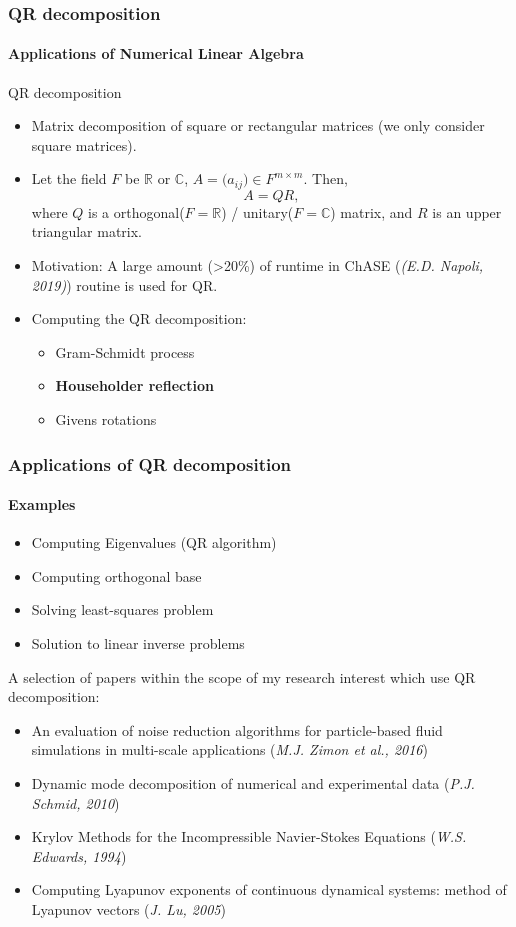 \begin{frame}
\frametitle{QR decomposition}
\framesubtitle{Applications of Numerical Linear Algebra}
QR decomposition
\begin{itemize}
 \item Matrix decomposition of square or rectangular matrices (we only consider square matrices).
 \item Let the field \(F\) be \(\mathbb{R}\) or \(\mathbb{C}\), \(A =\big( a_{ij} \big) \in F^{m \times m}\). Then,
 \begin{equation}
  A = QR,
 \end{equation}
 where \(Q\) is a orthogonal(\(F=\mathbb{R}\)) / unitary(\(F=\mathbb{C}\)) matrix, and \(R\) is an upper triangular matrix.
 \item Motivation: A large amount (>20\%) of runtime in ChASE (\emph{(E.D. Napoli, 2019)}) routine is used for QR.
 \item Computing the QR decomposition:
 \begin{itemize}
  \item Gram-Schmidt process
  \item \textbf{Householder reflection}
  \item Givens rotations
 \end{itemize}
\end{itemize}
\end{frame}

\begin{frame}
\frametitle{Applications of QR decomposition}
\framesubtitle{Examples}
\begin{itemize}
 \item Computing Eigenvalues (QR algorithm)
 \item Computing orthogonal base 
 \item Solving least-squares problem
 \item Solution to linear inverse problems
\end{itemize}
A selection of papers within the scope of my research interest which use QR decomposition:
\begin{itemize}
 \item An evaluation of noise reduction algorithms for particle-based fluid simulations in multi-scale applications (\emph{M.J. Zimon et al., 2016})
 \item Dynamic mode decomposition of numerical and experimental data (\emph{P.J. Schmid, 2010})
 \item Krylov Methods for the Incompressible Navier-Stokes Equations (\emph{W.S. Edwards, 1994})
 \item Computing Lyapunov exponents of continuous dynamical systems: method of Lyapunov vectors (\emph{J. Lu, 2005})
\end{itemize}
\end{frame}

